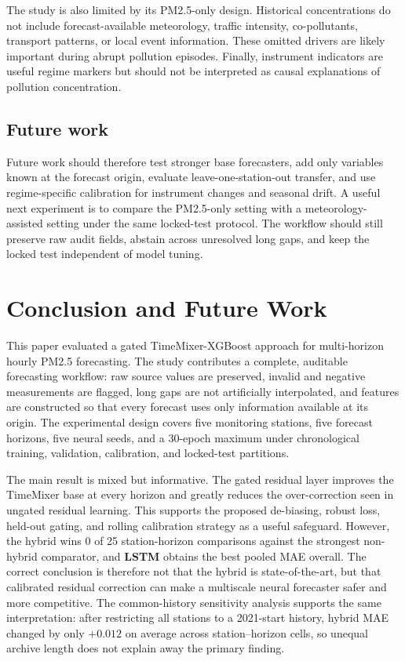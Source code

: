 \documentclass[sn-mathphys-num]{sn-jnl}
\begin{document}
The study is also limited by its PM2.5-only design. Historical concentrations
do not include forecast-available meteorology, traffic intensity,
co-pollutants, transport patterns, or local event information. These omitted
drivers are likely important during abrupt pollution episodes. Finally,
instrument indicators are useful regime markers but should not be interpreted
as causal explanations of pollution concentration.

\subsection{Future work}
\label{sec:discussion-future}

Future work should therefore test stronger base forecasters, add only
variables known at the forecast origin, evaluate leave-one-station-out
transfer, and use regime-specific calibration for instrument changes and
seasonal drift. A useful next experiment is to compare the PM2.5-only setting
with a meteorology-assisted setting under the same locked-test protocol. The
workflow should still preserve raw audit fields, abstain across unresolved
long gaps, and keep the locked test independent of model tuning.

\section{Conclusion and Future Work}
\label{sec:conclusion}

This paper evaluated a gated TimeMixer-XGBoost approach for multi-horizon
hourly PM2.5 forecasting. The study contributes a complete, auditable
forecasting workflow: raw source values are preserved, invalid and negative
measurements are flagged, long gaps are not artificially interpolated, and
features are constructed so that every forecast uses only information
available at its origin. The experimental design covers five monitoring
stations, five forecast horizons, five neural seeds, and a 30-epoch maximum
under chronological training, validation, calibration, and locked-test
partitions.

The main result is mixed but informative. The gated residual layer improves
the TimeMixer base at every horizon and greatly reduces the over-correction
seen in ungated residual learning. This supports the proposed de-biasing,
robust loss, held-out gating, and rolling calibration strategy as a useful
safeguard. However, the hybrid wins 0 of 25 station-horizon comparisons against
the strongest non-hybrid comparator, and \textbf{LSTM} obtains the best pooled
MAE overall. The correct conclusion is therefore not that the hybrid is
state-of-the-art, but that calibrated residual correction can make a multiscale
neural forecaster safer and more competitive. The common-history sensitivity
analysis supports the same interpretation: after restricting all stations to a
2021-start history, hybrid MAE changed by only \(+0.012\) on average across
station--horizon cells, so unequal archive length does not explain away the
primary finding.
\end{document}
